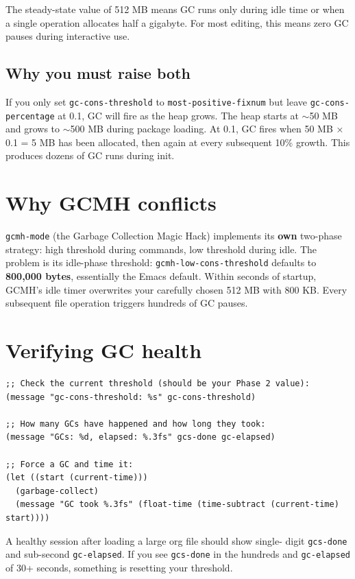 The steady-state value of 512 MB means GC runs only during idle time or when a single operation allocates half a gigabyte. For most editing, this means zero GC pauses during interactive use.

\subsection{Why you must raise \textbf{both}}\label{why-you-must-raise-both}

If you only set \texttt{gc-cons-threshold} to \texttt{most-positive-fixnum} but leave \texttt{gc-cons-percentage} at 0.1, GC will fire as the heap grows. The heap starts at \(\sim\)50 MB and grows to \(\sim\)500 MB during package loading. At 0.1, GC fires when 50 MB × 0.1 = 5 MB has been allocated, then again at every subsequent 10\% growth. This produces dozens of GC runs during init.

\section{Why GCMH conflicts}\label{why-gcmh-conflicts}

\texttt{gcmh-mode} (the Garbage Collection Magic Hack) implements its \textbf{own} two-phase strategy: high threshold during commands, low threshold during idle. The problem is its idle-phase threshold: \texttt{gcmh-low-cons-threshold} defaults to \textbf{800,000 bytes}, essentially the Emacs default. Within seconds of startup, GCMH's idle timer overwrites your carefully chosen 512 MB with 800 KB. Every subsequent file operation triggers hundreds of GC pauses.

\section{Verifying GC health}\label{verifying-gc-health}

\begin{verbatim}
;; Check the current threshold (should be your Phase 2 value):
(message "gc-cons-threshold: %s" gc-cons-threshold)

;; How many GCs have happened and how long they took:
(message "GCs: %d, elapsed: %.3fs" gcs-done gc-elapsed)

;; Force a GC and time it:
(let ((start (current-time)))
  (garbage-collect)
  (message "GC took %.3fs" (float-time (time-subtract (current-time) start))))
\end{verbatim}

A healthy session after loading a large org file should show single- digit \texttt{gcs-done} and sub-second \texttt{gc-elapsed}. If you see \texttt{gcs-done} in the hundreds and \texttt{gc-elapsed} of 30+ seconds, something is resetting your threshold.


